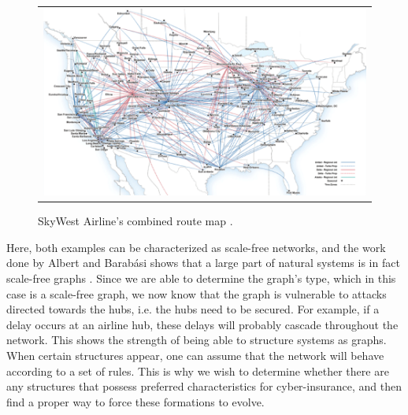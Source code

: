 \begin{figure}[h]
\centering
\begin{tabular}{@{}c@{}}
\includegraphics[width=1.0\textwidth]{../Figures/airlineRoutesUSA.png}
\end{tabular}
\caption[SkyWest Airline's combindes route map]{SkyWest Airline's combined route map \cite{airlineRoutes}.
\label{fig:airlineRouteMap}}
\end{figure}

Here, both examples can be characterized as scale-free networks, and the work done by Albert and Barabási shows that a large part of natural systems is in fact scale-free graphs \cite{audestad}. Since we are able to determine the graph's type, which in this case is a scale-free graph, we now know that the graph is vulnerable to attacks directed towards the hubs, i.e. the hubs need to be secured. For example, if a delay occurs at an airline hub, these delays will probably cascade throughout the network.
This shows the strength of being able to structure systems as graphs. When certain structures appear, one can assume that the network will behave according to a set of rules. This is why we wish to determine whether there are any structures that possess preferred characteristics for cyber-insurance, and then find a proper way to force these formations to evolve.










